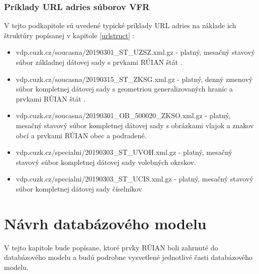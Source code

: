 \subsection {Príklady URL adries súborov VFR}
V tejto podkapitole sú uvedené typické príklady URL adries na základe ich štruktúry popísanej v kapitole \ref{urlstruct} :
\begin{itemize}
    \item vdp.cuzk.cz/soucasna/20190301\_ST\_UZSZ.xml.gz - platný, mesačný stavový súbor základnej dátovej sady s prvkami RÚIAN štát .
    \item{vdp.cuzk.cz/soucasna/20190315\_ST\_ZKSG.xml.gz - platný, denný zmenový súbor kompletnej dátovej sady s geometriou generalizovaných hraníc a prvkami RÚIAN štát .}
    \item{vdp.cuzk.cz/soucasna/20190301\_OB\_500020\_ZKSO.xml.gz - platný, mesačný stavový súbor kompletnej dátovej sady s obrázkami vlajok a znakov obcí a prvkami RÚIAN obec a podradené.}
    \item{vdp.cuzk.cz/specialni/20190303\_ST\_UVOH.xml.gz - platný, mesačný stavový súbor kompletnej dátovej sady volebných okrskov.}
    \item{vdp.cuzk.cz/specialni/20190303\_ST\_UCIS.xml.gz - platný, mesačný stavový súbor kompletnej dátovej sady číselníkov} 
\end{itemize}
\chapter {Návrh databázového modelu}
\label{chapter2}
V tejto kapitole bude popísane, ktoré prvky RÚIAN boli zahrnuté do databázového modelu a budú podrobne vysvetlené jednotlivé časti databázového modelu.
